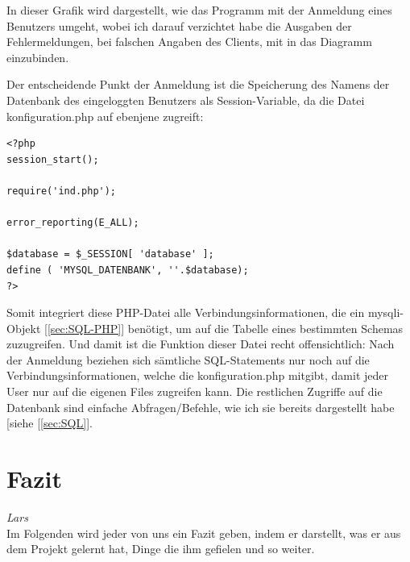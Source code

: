 \documentclass[12pt,a4paper,bibliography=totocnumbered,listof=totocnumbered]{scrartcl}
\begin{document}
\begin{minipage}{\linewidth}
In dieser Grafik wird dargestellt, wie das Programm mit der Anmeldung eines Benutzers umgeht, wobei ich darauf verzichtet habe die Ausgaben der Fehlermeldungen, bei falschen Angaben des Clients, mit in das Diagramm einzubinden.

Der entscheidende Punkt der Anmeldung ist die Speicherung des Namens der Datenbank des eingeloggten Benutzers als Session-Variable, da die Datei \glqq konfiguration.php\grqq{} auf ebenjene zugreift:

\vspace{1em}
\begin{lstlisting}[caption= Konfiguration.php, label=lst:konfiguration.php]
<?php
session_start();

require('ind.php');

error_reporting(E_ALL);

$database = $_SESSION[ 'database' ];
define ( 'MYSQL_DATENBANK', ''.$database);
?>
\end{lstlisting}

Somit integriert diese PHP-Datei alle Verbindungsinformationen, die ein \glqq mysqli-Objekt\grqq{} [\ref{sec:SQL-PHP}] benötigt, um auf die Tabelle eines bestimmten Schemas zuzugreifen.
Und damit ist die Funktion dieser Datei recht offensichtlich:
Nach der Anmeldung beziehen sich sämtliche SQL-Statements nur noch auf die Verbindungsinformationen, welche die \glqq konfiguration.php\grqq{} mitgibt, damit jeder User nur auf die eigenen Files zugreifen kann.
Die restlichen Zugriffe auf die Datenbank sind einfache Abfragen/Befehle, wie ich sie bereits dargestellt habe [siehe [\ref{sec:SQL}]. 
\pagebreak
\section{Fazit}
\label{sec:Fazit}
\emph{Lars}\\
Im Folgenden wird jeder von uns ein Fazit geben, indem er darstellt, was er aus dem Projekt gelernt hat, Dinge die ihm gefielen und so weiter.


\end{minipage}
\end{document}
